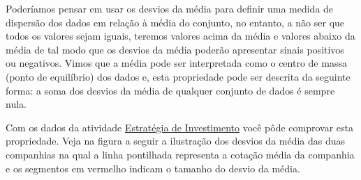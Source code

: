 {Poderíamos pensar em usar os desvios da média para definir uma medida de dispersão dos dados em relação à média do conjunto, no entanto, a não ser que todos os valores sejam iguais, teremos valores acima da média e valores abaixo da média de tal modo que os desvios da média poderão apresentar sinais positivos ou negativos. Vimos que a média pode ser interpretada como o centro de massa (ponto de equilíbrio) dos dados e, esta propriedade pode ser descrita da seguinte forma: a soma dos desvios da média de qualquer conjunto de dados é sempre nula.

Com os dados da atividade \hyperref[\detokenize{PE104-3:ativ-estrategia-de-investimento}]{Estratégia de Investimento} você pôde comprovar esta propriedade. Veja na figura a seguir a ilustração dos desvios da média das duas companhias na qual a linha pontilhada representa a cotação média da companhia e os segmentos em vermelho indicam o tamanho do desvio da média.

\begin{figure}[H]
\centering
\capstart

\begin{minipage}{0.45\textwidth}
\end{minipage}
\begin{minipage}{0.45\textwidth}
\end{minipage}
\end{figure}}
